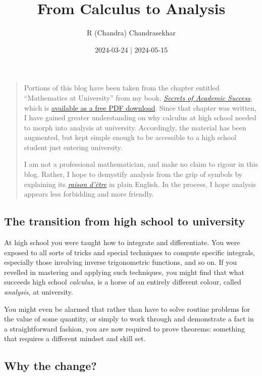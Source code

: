 \documentclass[
  a4paper,
]{article}
\title{From Calculus to Analysis}
\author{R (Chandra) Chandrasekhar}
\date{2024-03-24 | 2024-05-15}
\begin{document}
\maketitle

\thispagestyle{empty}


\begin{quote}
Portions of this blog have been taken from the chapter entitled
``Mathematics at University'' from my book,
\href{https://swanlotus.netlify.app/sas}{\emph{Secrets of Academic
Success}}, which is
\href{https://swanlotus.netlify.app/sas-manuscript/SAS-partial.pdf}{available
as a free PDF download}. Since that chapter was written, I have gained
greater understanding on why calculus at high school needed to morph
into analysis at university. Accordingly, the material has been
augmented, but kept simple enough to be accessible to a high school
student just entering university.

I am not a professional mathematician, and make no claim to rigour in
this blog. Rather, I hope to demystify analysis from the grip of symbols
by explaining its
\href{https://www.thefreedictionary.com/raison+d+etre}{\emph{raison
d'être}} in plain English. In the process, I hope analysis appears less
forbidding and more friendly.
\end{quote}

\subsection{The transition from high school to
university}\label{the-transition-from-high-school-to-university}

At high school you were taught how to integrate and differentiate. You
were exposed to all sorts of tricks and special techniques to compute
specific integrals, especially those involving inverse trigonometric
functions, and so on. If you revelled in mastering and applying such
techniques, you might find that what succeeds high school
\emph{calculus}, is a horse of an entirely different colour, called
\emph{analysis}, at university.

You might even be alarmed that rather than have to solve routine
problems for the value of some quantity, or simply to work through and
demonstrate a fact in a straightforward fashion, you are now required to
prove theorems: something that requires a different mindset and skill
set.

\subsection{Why the change?}\label{why-the-change}
\end{document}
